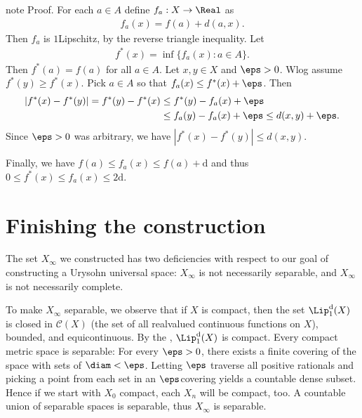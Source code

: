 \documentclass[letterpaper,10pt,english]{jupyterBook}
\begin{document}
\begin{sphinxadmonition}{note}
\sphinxAtStartPar
Proof. For each \(a \in A\) define \(f_a: X \to \Real\) as
\begin{equation*}
\begin{split}
	f_a(x) = f(a) + d(a,x).
\end{split}
\end{equation*}
\sphinxAtStartPar
Then \(f_a\) is \(1\)\sphinxhyphen{}Lipschitz, by the reverse triangle inequality. Let
\begin{equation*}
\begin{split}
	f^*(x) = \inf \{f_a(x) \colon a \in A\}. 
\end{split}
\end{equation*}
\sphinxAtStartPar
Then \(f^*(a) = f(a)\) for all \(a \in A\). Let \(x,y \in X\) and \(\eps > 0\). Wlog assume \(f^*(y) \geq f^*(x)\). Pick \(a \in A\) so that \(f_a(x) \leq f^*(x)   + \eps\). Then
\begin{align*}
	|f^*(x) - f^*(y)| = f^*(y) - f^*(x) & \leq f^*(y) - f_a(x) + \eps \\
		& \leq f_a(y) - f_a(x) + \eps \leq d(x,y) + \eps.
\end{align*}
\sphinxAtStartPar
Since \(\eps > 0\) was arbitrary, we have \(|f^*(x) - f^*(y)| \leq d(x,y)\).

\sphinxAtStartPar
Finally, we have \(f(a) \leq f_a(x) \leq f(a) + \mathrm{d}\) and thus \(0 \leq f^*(x) \leq f_a(x) \leq 2\mathrm{d}\).
\end{sphinxadmonition}


\section{Finishing the construction}
\label{\detokenize{Urysohn:finishing-the-construction}}\label{\detokenize{Urysohn:ury-finishing-construction}}
\sphinxAtStartPar
The set \(X_\infty\) we constructed has two deficiencies with respect to our goal of constructing a Urysohn universal space: \(X_\infty\) is not necessarily separable, and \(X_\infty\) is not necessarily complete.

\sphinxAtStartPar
To make \(X_\infty\) separable, we observe that if \(X\) is compact, then the set \(\Lip^{\mathrm{d}}_1(X)\) is closed in \(\mathcal{C}(X)\) (the set of all real\sphinxhyphen{}valued continuous functions on \(X\)), bounded, and equicontinuous. By the , \(\Lip^{\mathrm{d}}_1(X)\) is compact.
Every compact metric space is separable: For every \(\eps > 0\), there exists a finite covering of the space with sets of \(\diam < \eps\). Letting \(\eps\) traverse all positive rationals and picking a point from each set in an \(\eps\)\sphinxhyphen{}covering yields a countable dense subset. Hence if we start with \(X_0\) compact, each \(X_n\) will be compact, too. A countable union of separable spaces is separable, thus \(X_\infty\) is separable.
\end{document}
